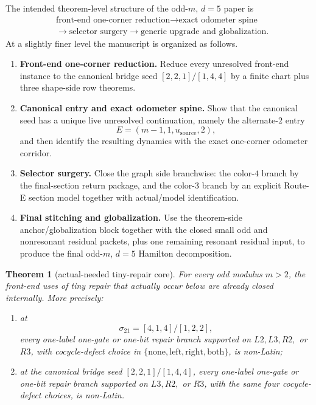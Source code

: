 \documentclass[11pt]{article}
\newtheorem{theorem}{Theorem}[section]
\newcommand{\sig}[2]{\sigma_{#1#2}}
\newcommand{\CanL}{[2,2,1]}
\newcommand{\CanR}{[1,4,4]}
\newcommand{\CanSeed}{\CanL/\CanR}
\begin{document}
The intended theorem-level structure of the odd-$m$, $d=5$ paper is
\[
\begin{aligned}
&\text{front-end one-corner reduction}
\to
\text{exact odometer spine}\\
&\to
\text{selector surgery}
\to
\text{generic upgrade and globalization}.
\end{aligned}
\]
At a slightly finer level the manuscript is organized as follows.
\begin{enumerate}[label=\textup{(\Roman*)},leftmargin=3.0em]
\item \textbf{Front-end one-corner reduction.}
      Reduce every unresolved front-end instance to the canonical bridge seed
      \(\CanSeed\) by a finite chart plus three shape-side row theorems.
\item \textbf{Canonical entry and exact odometer spine.}
      Show that the canonical seed has a unique live unresolved continuation,
      namely the alternate-$2$ entry
      \[
      E=(m-1,1,u_{\mathrm{source}},2),
      \]
      and then identify the resulting dynamics with the exact one-corner
      odometer corridor.
\item \textbf{Selector surgery.}
      Close the graph side branchwise: the color-$4$ branch by the final-section
      return package, and the color-$3$ branch by an explicit Route-E section
      model together with actual/model identification.
\item \textbf{Final stitching and globalization.}
      Use the theorem-side anchor/globalization block together with the closed
      small odd and nonresonant residual packets, plus one remaining resonant
      residual input, to produce the final odd-$m$, $d=5$ Hamilton
      decomposition.
\end{enumerate}

\begin{theorem}[actual-needed tiny-repair core]
\label{thm:T0-needed}
For every odd modulus $m>2$, the front-end uses of tiny repair that actually
occur below are already closed internally.
More precisely:
\begin{enumerate}[label=\textup{(\arabic*)},leftmargin=2.8em]
\item at
      \[
      \sig21=[4,1,4]/[1,2,2],
      \]
      every one-label one-gate or one-bit repair branch supported on
      \(L2,L3,R2,\) or \(R3\), with cocycle-defect choice in
      \(\{\mathrm{none},\mathrm{left},\mathrm{right},\mathrm{both}\}\),
      is non-Latin;
\item at the canonical bridge seed \(\CanSeed\), every one-label one-gate or
      one-bit repair branch supported on \(L3,R2,\) or \(R3\), with the same
      four cocycle-defect choices, is non-Latin.
\end{enumerate}
\end{theorem}
\end{document}
